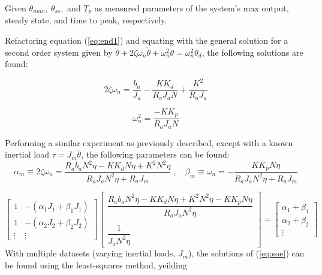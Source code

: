 Given $\theta_{max},~\theta_{ss},$ and $T_p$ as measured parameters of the system's max output, steady state, and time to peak, respectively.

Refactoring equation (\ref{eq:end1}) and equating with the general solution for a second order system given by $\ddot{\theta} + 2\zeta\omega_n\dot{\theta} + \omega_n^2\theta = \omega_n^2\theta_d$, the following solutions are found:

\begin{minipage}[c]{.5\textwidth}
\begin{equation}
  2\zeta\omega_n = \frac{b_a}{J_a} - \frac{KK_d}{R_aJ_aN} + \frac{K^2}{R_aJ_a}
  \label{eq:one}
\end{equation}
\end{minipage}%
\begin{minipage}[c]{.5\textwidth}
\begin{equation}
  \omega_n^2 = \frac{-KK_p}{R_aJ_aN}
  \label{eq:two}
\end{equation}
\end{minipage}

Performing a similar experiment as previously described, except with a known inertial load $\tau = J_m\ddot{\theta}$, the following parameters can be found:
\[
  \alpha_m \equiv 2\zeta\omega_n = \frac{R_ab_aN^2\eta-KK_dN\eta+K^2N^2\eta}{R_aJ_aN^2\eta+R_aJ_m}~,\quad
  \beta_m \equiv \omega_n =-\frac{KK_pN\eta}{R_aJ_aN^2\eta+R_aJ_m}
\]

\begin{equation}
\begin{bmatrix}
  1 & -(\alpha_1J_1+\beta_1J_1) \\
  1 & -(\alpha_2J_2+\beta_2J_2) \\
  \vdots & \vdots
\end{bmatrix}
\begin{bmatrix}
  \dfrac{R_ab_aN^2\eta-KK_dN\eta+K^2N^2\eta-KK_pN\eta}{R_aJ_aN^2\eta} \\
  ~\\
  \dfrac{1}{J_aN^2\eta}
\end{bmatrix}
=
\begin{bmatrix}
  \alpha_1+\beta_1 \\
  \alpha_2+\beta_2 \\
  \vdots
\end{bmatrix}
\label{eq:soe}
\end{equation}
With multiple datasets (varying inertial loads, $J_m$), the solutions of (\ref{eq:soe}) can be found using the least-squares method, yeilding

